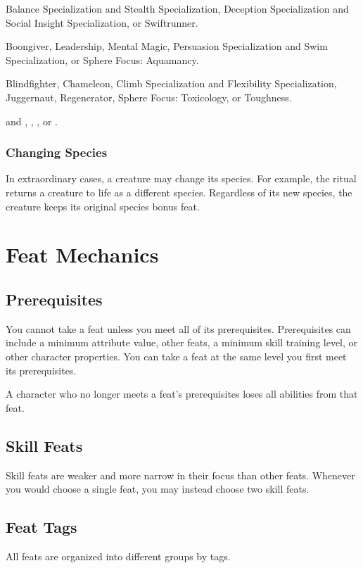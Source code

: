        Balance Specialization and Stealth Specialization, Deception Specialization and Social Insight Specialization, or Swiftrunner.

       Boongiver, Leadership, Mental Magic, Persuasion Specialization and Swim Specialization, or Sphere Focus: Aquamancy.

       Blindfighter, Chameleon, Climb Specialization and Flexibility Specialization, Juggernaut, Regenerator, Sphere Focus: Toxicology, or Toughness.

        and , , , or .

    \subsubsection{Changing Species}
      In extraordinary cases, a creature may change its species.
      For example, the  ritual returns a creature to life as a different species.
      Regardless of its new species, the creature keeps its original species bonus feat.

\section{Feat Mechanics}

  \subsection{Prerequisites}
    You cannot take a feat unless you meet all of its prerequisites.
    Prerequisites can include a minimum attribute value, other feats, a minimum skill training level, or other character properties.
    You can take a feat at the same level you first meet its prerequisites.

    A character who no longer meets a feat's prerequisites loses all abilities from that feat.

  \subsection{Skill Feats}
    Skill feats are weaker and more narrow in their focus than other feats.
    Whenever you would choose a single feat, you may instead choose two skill feats.

  \subsection{Feat Tags}
    All feats are organized into different groups by tags.

